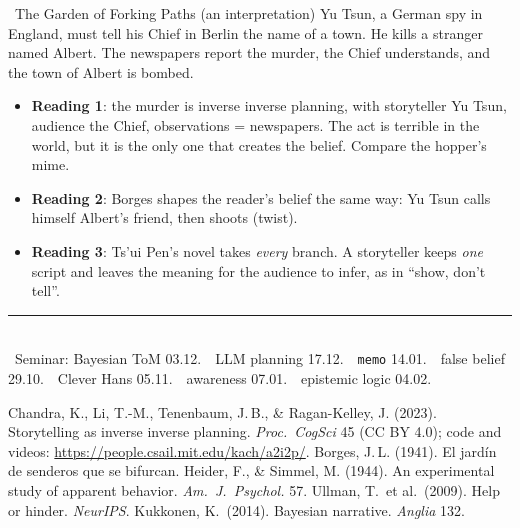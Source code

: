 \documentclass[10pt,a4paper]{article}
\newcommand{\belief}[1]{\textcolor{beliefPurple}{#1}}
\newcommand{\teller}[1]{\textcolor{tellerTeal}{#1}}
\newcommand{\borges}[1]{\textcolor{borgesRed}{#1}}
\newcommand{\note}[1]{{\footnotesize\color{black!70}#1}}
\begin{document}
\begin{minipage}[t]{0.49\linewidth}
\begin{mblock}{\faUserSecret\ \borges{The Garden of Forking Paths} (an interpretation)}
Yu Tsun, a German spy in England, must tell his Chief in Berlin the name of a town. He kills a stranger named Albert. The newspapers report the murder, the Chief understands, and the town of Albert is bombed.
\begin{itemize}
  \item \textbf{Reading 1}: the murder is inverse inverse planning, with \teller{storyteller} Yu Tsun, \belief{audience} the Chief, observations = newspapers. The act is terrible in the world, but it is the only one that creates the belief. Compare the hopper's mime.
  \item \textbf{Reading 2}: Borges shapes the reader's belief the same way: Yu Tsun calls himself Albert's friend, then shoots (twist).
  \item \textbf{Reading 3}: Ts'ui Pen's novel takes \emph{every} branch. A storyteller keeps \emph{one} script and leaves the meaning for the audience to infer, as in ``show, don't tell''.
\end{itemize}
\end{mblock}


\end{minipage}

\vfill
{\color{black!30}\rule{\linewidth}{0.4pt}}\\[0.1em]
\note{\faLink\ Seminar: Bayesian ToM 03.12.\ \textbullet\ LLM planning 17.12.\ \textbullet\ \texttt{memo} 14.01.\ \textbullet\ false belief 29.10.\ \textbullet\ Clever Hans 05.11.\ \textbullet\ awareness 07.01.\ \textbullet\ epistemic logic 04.02.}\\[0.2em]
{\scriptsize\color{black!70}
Chandra, K., Li, T.-M., Tenenbaum, J.\,B., \& Ragan-Kelley, J. (2023). Storytelling as inverse inverse planning. \emph{Proc.\ CogSci} 45 (CC BY 4.0); code and videos: \url{https://people.csail.mit.edu/kach/a2i2p/}.
Borges, J.\,L. (1941). El jardín de senderos que se bifurcan.
Heider, F., \& Simmel, M. (1944). An experimental study of apparent behavior. \emph{Am.\ J.\ Psychol.} 57.
Ullman, T.\ et al.\ (2009). Help or hinder. \emph{NeurIPS}.
Kukkonen, K.\ (2014). Bayesian narrative. \emph{Anglia} 132.\par}
\end{document}
